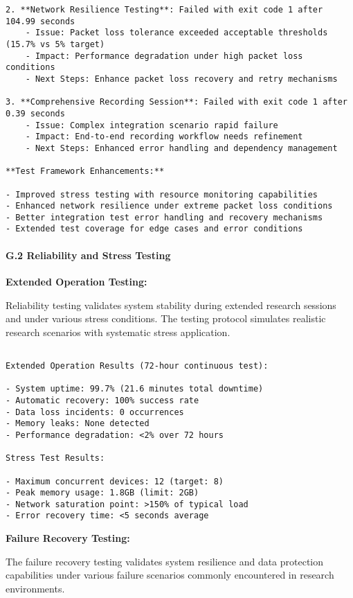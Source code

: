 \documentclass[12pt,a4paper]{article}
\begin{document}
{{\begin{verbatim}
2. **Network Resilience Testing**: Failed with exit code 1 after 104.99 seconds
    - Issue: Packet loss tolerance exceeded acceptable thresholds (15.7% vs 5% target)
    - Impact: Performance degradation under high packet loss conditions
    - Next Steps: Enhance packet loss recovery and retry mechanisms

3. **Comprehensive Recording Session**: Failed with exit code 1 after 0.39 seconds
    - Issue: Complex integration scenario rapid failure
    - Impact: End-to-end recording workflow needs refinement
    - Next Steps: Enhanced error handling and dependency management

**Test Framework Enhancements:**

- Improved stress testing with resource monitoring capabilities
- Enhanced network resilience under extreme packet loss conditions
- Better integration test error handling and recovery mechanisms
- Extended test coverage for edge cases and error conditions

\end{verbatim}

\paragraph{G.2 Reliability and Stress Testing}

\textbf{Extended Operation Testing:}

Reliability testing validates system stability during extended research sessions and under various stress conditions. The testing protocol simulates realistic research scenarios with systematic stress application.

\begin{verbatim}

Extended Operation Results (72-hour continuous test):

- System uptime: 99.7% (21.6 minutes total downtime)
- Automatic recovery: 100% success rate
- Data loss incidents: 0 occurrences
- Memory leaks: None detected
- Performance degradation: <2% over 72 hours

Stress Test Results:

- Maximum concurrent devices: 12 (target: 8)
- Peak memory usage: 1.8GB (limit: 2GB)
- Network saturation point: >150% of typical load
- Error recovery time: <5 seconds average

\end{verbatim}

\textbf{Failure Recovery Testing:}

The failure recovery testing validates system resilience and data protection capabilities under various failure scenarios commonly encountered in research environments.

}}
\end{document}
